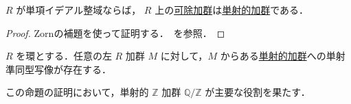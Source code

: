 \documentclass[algtopo_main]{subfiles}
\begin{document}
\begin{myprop}[label=prop:PID-inj-divisable]{}
    $R$ が単項イデアル整域ならば，
    $R$ 上の\hyperref[def:divisable-mod]{可除加群}は\hyperref[def:inj-mod]{単射的加群}である．
\end{myprop}

\begin{proof}
    Zornの補題を使って証明する．~\cite[命題1.98]{Shiho}を参照．
\end{proof}

\begin{myprop}[label=prop:inj-mod-injection]{}
    $R$ を環とする．任意の左 $R$ 加群 $M$ に対して，$M$ からある\hyperref[def:inj-mod]{単射的加群}への単射準同型写像が存在する．
\end{myprop}

この命題の証明において，単射的 $\mathbb{Z}$ 加群 $\mathbb{Q} / \mathbb{Z}$ が主要な役割を果たす．
\end{document}
